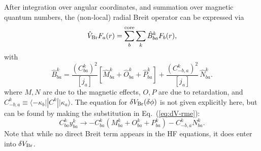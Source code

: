 \documentclass[10pt,twocolumn,a4paper]{article}%
\newcommand{\bra}[1]{\ensuremath{\langle #1|}}	%
\newcommand{\ket}[1]{\ensuremath{|#1\rangle}}	%
\newcommand{\be}{\begin{equation}}
\newcommand{\ee}{\end{equation}}
\renewcommand{\k}{\ensuremath{\kappa}}
\begin{document}
After integration over angular coordinates, and summation over magnetic quantum numbers, the (non-local) radial Breit operator can be expressed via
\be\label{eq:HF_Breit}
\hat V_{\rm Br} F_a(r) = \sum_b^{\rm core}\sum_k \hat B^k_{ba}F_b(r),
\ee
with
\begin{equation}
\hat B^k_{ba} =   \frac{(C^k_{ba})^2 }{[j_a]}  \left[\hat M^k_{ba} + \hat O^k_{ba} + \hat P^k_{ba}\right]
 +
 \frac{(C^k_{-b,a})^2}{[j_a]} \, \hat N^k_{ba}.
\end{equation}
where
$M,N$ are due to the magnetic effects, $O,P$ are due to retardation, and
 $C^k_{-b,a} \equiv \bra{-\k_b}|C^k|\ket{\k_a}$. 
The equation for $\delta V_{\rm Br}(\delta\phi)$ is not given explicitly here, 
but can be found by making the substitution in Eq.~(\ref{eq:dV-rme}):
\[
C^k_{ba}y^k_{ba}\to -C^k_{ba}(M_{ba}^k+O_{ba}^k+P_{ba}^k)  -C^k_{-b,a}N_{ba}^k.
\]
Note that while no direct Breit term appears in the HF equations, it does enter into $\delta V_{\rm Br}$.
\end{document}

